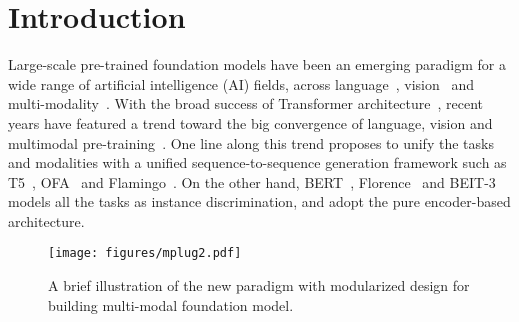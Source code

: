 \documentclass{article}
\theoremstyle{plain}
\theoremstyle{definition}
\theoremstyle{remark}
\begin{document}
\vspace{-5ex}
\section{Introduction}
Large-scale pre-trained foundation models have been an emerging paradigm for a wide range of artificial intelligence (AI) fields, across language~\citep{devlin2018bert,Tom2020GPT3}, vision~\citep{dosovitskiy2020image,liu2021Swin} and multi-modality~\citep{radford2021learning,Yu2022CoCaCC,Wang2022BEITv3}. With the broad success of Transformer architecture~\citep{vaswani2017attention}, recent years have featured a trend toward the big convergence of language, vision and multimodal pre-training~\citep{Yu2022CoCaCC,Wang2022BEITv3,Alayrac2022FlamingoAV}. One line along this trend proposes to unify the tasks and modalities with a unified sequence-to-sequence generation framework such as T5~\citep{Colin2020T5}, OFA~\citep{Wang2022OFA} and Flamingo~\citep{Alayrac2022FlamingoAV}. On the other hand, BERT~\citep{devlin2018bert}, Florence~\citep{yuan2021florence} and BEIT-3~\citep{Wang2022BEITv3} models all the tasks as instance discrimination, and adopt the pure encoder-based architecture. 




\begin{figure}
    \centering
    \texttt{[image: figures/mplug2.pdf]}
\caption{A brief illustration of the new paradigm with modularized design for building multi-modal foundation model.}
\vspace{-4ex}
\label{fig:mplug2}
\end{figure}
\end{document}
